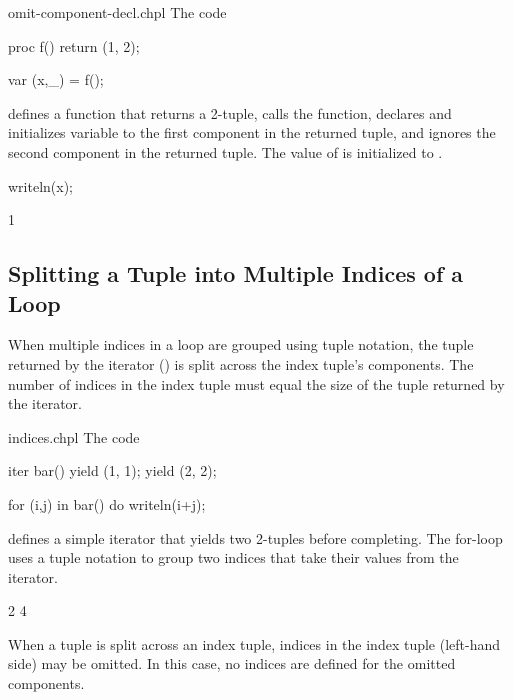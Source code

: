 \begin{chapelexample}{omit-component-decl.chpl}
The code
\begin{chapel}
proc f()
  return (1, 2);

var (x,_) = f();
\end{chapel}
defines a function that returns a 2-tuple, calls the function,
declares and initializes variable  to the first component in
the returned tuple, and ignores the second component in the returned
tuple.  The value of  is initialized to .
\begin{chapelpost}
writeln(x);
\end{chapelpost}
\begin{chapeloutput}
1
\end{chapeloutput}
\end{chapelexample}

\subsection{Splitting a Tuple into Multiple Indices of a Loop}
\label{Indices_in_a_Tuple}

When multiple indices in a loop are grouped using tuple notation, the tuple
returned by the iterator () is split across the index tuple's components.  The
number of indices in the index tuple must equal the size of the tuple
returned by the iterator.

\begin{chapelexample}{indices.chpl}
The code
\begin{chapel}
iter bar() {
  yield (1, 1);
  yield (2, 2);
}

for (i,j) in bar() do
  writeln(i+j);
\end{chapel}
defines a simple iterator that yields two 2-tuples before completing.
The for-loop uses a tuple notation to group two indices that take
their values from the iterator.
\begin{chapelpost}
\end{chapelpost}
\begin{chapeloutput}
2
4
\end{chapeloutput}
\end{chapelexample}

When a tuple is split across an index tuple, indices in the index
tuple (left-hand side) may be omitted.  In this case, no indices are
defined for the omitted components.

